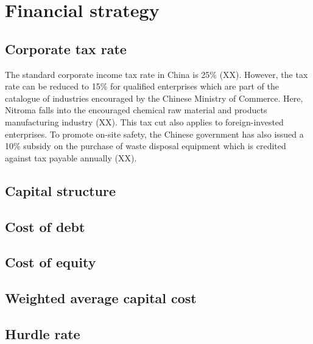 \section{Financial strategy}
\subsection{Corporate tax rate}
The standard corporate income tax rate in China is 25\% (XX). However, the tax rate can be reduced to 15\% for qualified enterprises which are part of the catalogue of industries encouraged by the Chinese Ministry of Commerce. Here, Nitroma falls into the encouraged chemical raw material and products manufacturing industry (XX). This tax cut also applies to foreign-invested enterprises. To promote on-site safety, the Chinese government has also issued a 10\% subsidy on the purchase of waste disposal equipment which is credited against tax payable annually (XX).

\subsection{Capital structure}
\subsection{Cost of debt}
\subsection{Cost of equity}
\subsection{Weighted average capital cost}
\subsection{Hurdle rate}
